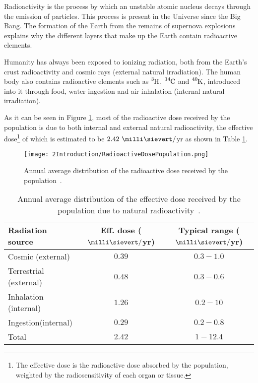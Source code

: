 Radioactivity is the process by which an unstable atomic nucleus decays through the emission of particles. This process is present in the Universe since the Big Bang. The formation of the Earth from the remains of supernova explosions explains why the different layers that make up the Earth contain radioactive elements. 

Humanity has always been exposed to ionizing radiation, both from the Earth's crust radioactivity and cosmic rays (external natural irradiation). The human body also contains radioactive elements such as $\ce{^{3}H}$, $\ce{^{14}C}$ and $\ce{^{40}K}$, introduced into it through food, water ingestion and air inhalation (internal natural irradiation). %

As it can be seen in Figure \ref{fig:RadioactiveDosePopulation}, most of the radioactive dose received by the population is due to both internal and external natural radioactivity, the effective dose\footnote{The effective dose is the radioactive dose absorbed by the population, weighted by the radiosensitivity of each organ or tissue.} of which is estimated to be $2.42~\milli\sievert/$yr as shown in Table \ref{tab:RadioactiveNaturalDosePopulation}. 

\begin{figure}[h]
\texttt{[image: 2Introduction/RadioactiveDosePopulation.png]}
\centering
\caption{Annual average distribution of the radioactive dose received by the population~\cite{IAEA}\label{fig:RadioactiveDosePopulation}.}
\end{figure}

\begin{table}[h]
\centering{}%
\begin{tabular}{lcc}
\toprule 
Radiation source & Eff. dose ($\milli\sievert/$yr) & Typical range ($\milli\sievert/$yr)\tabularnewline
\midrule
\midrule 
Cosmic (external) & $0.39$ & $0.3 - 1.0$ \tabularnewline
Terrestrial (external) & $0.48$ & $0.3-0.6$ \tabularnewline  
Inhalation (internal) & $1.26$ & $0.2-10$ \tabularnewline
Ingestion(internal) & $0.29$ & $0.2-0.8$ \tabularnewline
\midrule
Total & $2.42$ & $1-12.4$ \tabularnewline
\bottomrule
\end{tabular}
\caption{Annual average distribution of the effective dose received by the population due to natural radioactivity~\cite{UNSCEAR, CSN}.}
\label{tab:RadioactiveNaturalDosePopulation}
\end{table}

